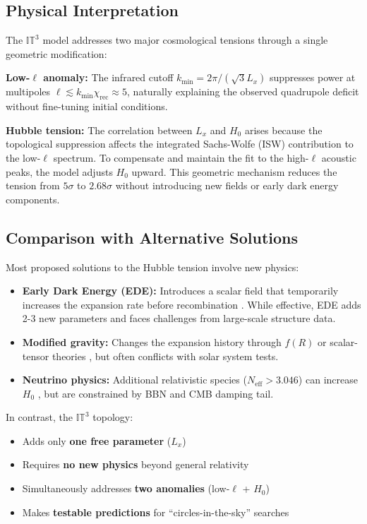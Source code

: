 \documentclass[a4paper,11pt]{article}
\begin{document}
\subsection{Physical Interpretation}

The $\mathbb{IT}^3$ model addresses two major cosmological tensions through a single geometric modification:

\textbf{Low-$\ell$ anomaly:} The infrared cutoff $k_{\min} = 2\pi/(\sqrt{3}L_x)$ suppresses power at multipoles $\ell \lesssim k_{\min}\chi_{\text{rec}} \approx 5$, naturally explaining the observed quadrupole deficit without fine-tuning initial conditions.

\textbf{Hubble tension:} The correlation between $L_x$ and $H_0$ arises because the topological suppression affects the integrated Sachs-Wolfe (ISW) contribution to the low-$\ell$ spectrum. To compensate and maintain the fit to the high-$\ell$ acoustic peaks, the model adjusts $H_0$ upward. This geometric mechanism reduces the tension from $5\sigma$ to $2.68\sigma$ without introducing new fields or early dark energy components.

\subsection{Comparison with Alternative Solutions}

Most proposed solutions to the Hubble tension involve new physics:
\begin{itemize}
    \item \textbf{Early Dark Energy (EDE):} Introduces a scalar field that temporarily increases the expansion rate before recombination \citep{EDE2019}. While effective, EDE adds 2-3 new parameters and faces challenges from large-scale structure data.
    
    \item \textbf{Modified gravity:} Changes the expansion history through $f(R)$ or scalar-tensor theories \citep{ModGravity2020}, but often conflicts with solar system tests.
    
    \item \textbf{Neutrino physics:} Additional relativistic species ($N_{\text{eff}} > 3.046$) can increase $H_0$ \citep{Neutrino2021}, but are constrained by BBN and CMB damping tail.
\end{itemize}

In contrast, the $\mathbb{IT}^3$ topology:
\begin{itemize}
    \item Adds only \textbf{one free parameter} ($L_x$)
    \item Requires \textbf{no new physics} beyond general relativity
    \item Simultaneously addresses \textbf{two anomalies} (low-$\ell$ + $H_0$)
    \item Makes \textbf{testable predictions} for ``circles-in-the-sky'' searches
\end{itemize}
\end{document}
